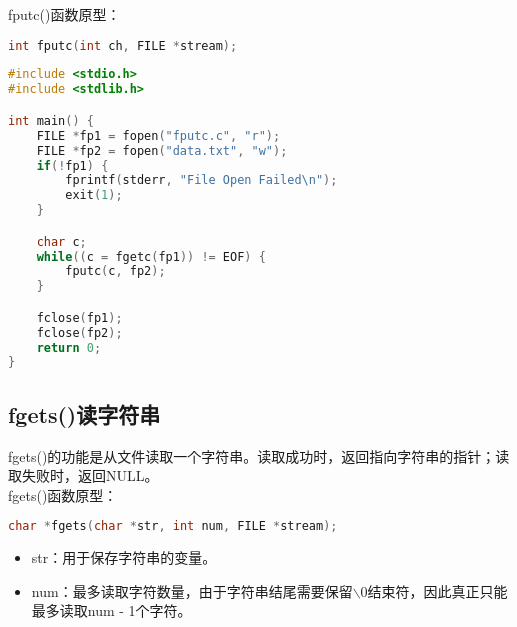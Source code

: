 fputc()函数原型：

\vspace{-0.5cm}

\begin{lstlisting}[language=C]
int fputc(int ch, FILE *stream);
\end{lstlisting}

\vspace{0.5cm}


\begin{lstlisting}[language=C, title=fputc.c]
#include <stdio.h>
#include <stdlib.h>

int main() {
    FILE *fp1 = fopen("fputc.c", "r");
    FILE *fp2 = fopen("data.txt", "w");
    if(!fp1) {
        fprintf(stderr, "File Open Failed\n");
        exit(1);
    }

    char c;
    while((c = fgetc(fp1)) != EOF) {
        fputc(c, fp2);
    }

    fclose(fp1);
    fclose(fp2);
    return 0;
}
\end{lstlisting}

\vspace{0.5cm}

\subsection{fgets()读字符串}

fgets()的功能是从文件读取一个字符串。读取成功时，返回指向字符串的指针；读取失败时，返回NULL。\\

fgets()函数原型：

\vspace{-0.5cm}

\begin{lstlisting}[language=C]
char *fgets(char *str, int num, FILE *stream);
\end{lstlisting}

\begin{itemize}
    \item str：用于保存字符串的变量。
    \item num：最多读取字符数量，由于字符串结尾需要保留$ \backslash $0结束符，因此真正只能最多读取num - 1个字符。
\end{itemize}

\vspace{0.5cm}


